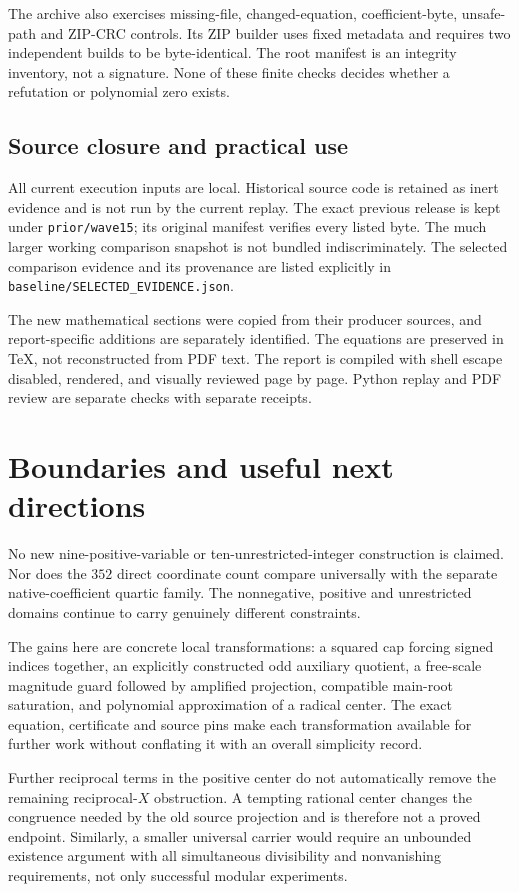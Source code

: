 The archive also exercises missing-file, changed-equation, coefficient-byte,
unsafe-path and ZIP-CRC controls. Its ZIP builder uses fixed metadata and
requires two independent builds to be byte-identical. The root manifest is
an integrity inventory, not a signature. None of these finite checks decides
whether a refutation or polynomial zero exists.

\subsection{Source closure and practical use}
All current execution inputs are local. Historical source code is retained
as inert evidence and is not run by the current replay. The exact previous
release is kept under \texttt{prior/wave15}; its original manifest verifies
every listed byte. The much larger working comparison snapshot is not
bundled indiscriminately. The selected comparison evidence and its provenance
are listed explicitly in \texttt{baseline/SELECTED\_EVIDENCE.json}.

The new mathematical sections were copied from their producer sources, and
report-specific additions are separately identified. The equations are
preserved in TeX, not reconstructed from PDF text. The report is compiled
with shell escape disabled, rendered, and visually reviewed page by page.
Python replay and PDF review are separate checks with separate receipts.

\section{Boundaries and useful next directions}
No new nine-positive-variable or ten-unrestricted-integer construction is
claimed. Nor does the $352$ direct coordinate count compare universally with
the separate native-coefficient quartic family. The nonnegative, positive
and unrestricted domains continue to carry genuinely different constraints.

The gains here are concrete local transformations: a squared cap forcing
signed indices together, an explicitly constructed odd auxiliary quotient,
a free-scale magnitude guard followed by amplified projection, compatible
main-root saturation, and polynomial approximation of a radical center.
The exact equation, certificate and source pins make each transformation
available for further work without conflating it with an overall simplicity
record.

Further reciprocal terms in the positive center do not automatically remove
the remaining reciprocal-$X$ obstruction. A tempting rational center changes
the congruence needed by the old source projection and is therefore not a
proved endpoint. Similarly, a smaller universal carrier would require an
unbounded existence argument with all simultaneous divisibility and
nonvanishing requirements, not only successful modular experiments.
